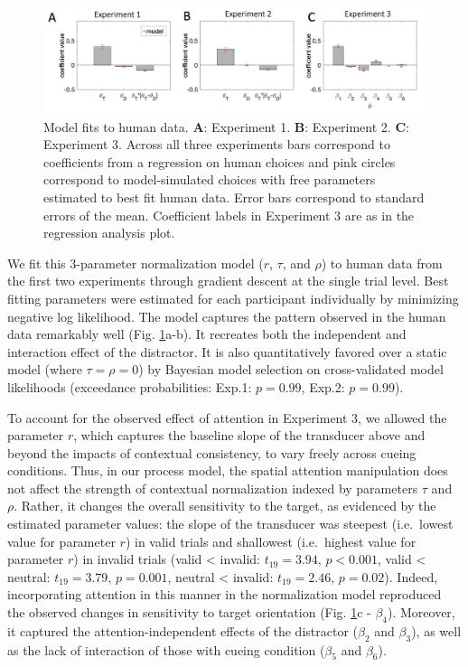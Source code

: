 \documentclass[a4paper, nobind]{templates/ociamthesis}
\begin{document}
\begin{figure}

{\centering \includegraphics[width=1\linewidth]{figures/distr-model-fit} 

}

\caption[Computational model, Fits to human data]{Model fits to human data. $\textbf{A:}$ Experiment 1. $\textbf{B:}$ Experiment 2. $\textbf{C:}$ Experiment 3. Across all three experiments bars correspond to coefficients from a regression on human choices and pink circles correspond to model-simulated choices with free parameters estimated to best fit human data. Error bars correspond to standard errors of the mean. Coefficient labels in Experiment 3 are as in the regression analysis plot.}\label{fig:distr-model-fit}
\end{figure}

We fit this 3-parameter normalization model (\(r\), \(\tau\), and \(\rho\)) to human data from the first two experiments through gradient descent at the single trial level. Best fitting parameters were estimated for each participant individually by minimizing negative log likelihood. The model captures the pattern observed in the human data remarkably well (Fig. \ref{fig:distr-model-fit}a-b). It recreates both the independent and interaction effect of the distractor. It is also quantitatively favored over a static model (where \(\tau=\rho=0\)) by Bayesian model selection on cross-validated model likelihoods (exceedance probabilities: Exp.1: \(p=0.99\), Exp.2: \(p=0.99\)).

To account for the observed effect of attention in Experiment 3, we allowed the parameter \(r\), which captures the baseline slope of the transducer above and beyond the impacts of contextual consistency, to vary freely across cueing conditions. Thus, in our process model, the spatial attention manipulation does not affect the strength of contextual normalization indexed by parameters \(\tau\) and \(\rho\). Rather, it changes the overall sensitivity to the target, as evidenced by the estimated parameter values: the slope of the transducer was steepest (i.e.~lowest value for parameter \(r\)) in valid trials and shallowest (i.e.~highest value for parameter \(r\)) in invalid trials (valid \textless{} invalid: \(t_{19}=3.94\), \(p<0.001\), valid \textless{} neutral: \(t_{19}=3.79\), \(p=0.001\), neutral \textless{} invalid: \(t_{19}=2.46\), \(p=0.02\)). Indeed, incorporating attention in this manner in the normalization model reproduced the observed changes in sensitivity to target orientation (Fig. \ref{fig:distr-model-fit}c - \(\beta_4\)). Moreover, it captured the attention-independent effects of the distractor (\(\beta_2\) and \(\beta_3\)), as well as the lack of interaction of those with cueing condition (\(\beta_5\) and \(\beta_6\)).
\end{document}
